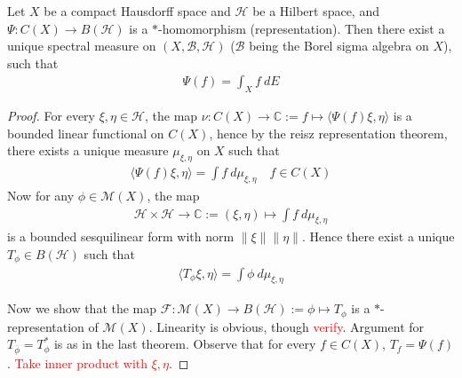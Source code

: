 

\begin{theorem}
  Let $X$ be a compact Hausdorff space and $\mathcal{H}$ be a
  Hilbert space, and $\Psi: C(X) \to B(\mathcal{H})$ is a
  $*$-homomorphism (representation). Then there exist a unique
  spectral measure on $(X, \mathcal{B}, \mathcal{H})$ ($\mathcal{B}$
  being the Borel sigma algebra on $X$), such that
  \begin{align*}
    \Psi(f) = \int_X  f \ d E
  \end{align*}
\end{theorem}
\begin{proof}
  For every $\xi, \eta \in \mathcal{H}$, the map $ \nu : C(X) \to
  \mathbb{C}  :=  f \mapsto \langle  \Psi(f) \xi ,  \eta \rangle $ is
  a bounded linear functional on $C(X)$, hence by the reisz
  representation theorem, there exists a unique measure $\mu_{\xi,
  \eta}$ on $X$ such that
  \begin{align*}
    \langle \Psi(f) \xi ,  \eta \rangle  = \int f \ d \mu_{\xi,
    \eta} \quad f \in C(X)
  \end{align*}
  Now for any $\phi \in \mathcal{M}(X)$, the map
  \begin{align*}
    \mathcal{H}\times \mathcal{H} \to  \mathbb{C} :=  (\xi, \eta)
    \mapsto \int f \ d \mu_{\xi, \eta}
  \end{align*}
  is a bounded sesquilinear form with norm $\|\xi\|\|\eta\|$. Hence
  there exist a unique $T_\phi \in B(\mathcal{H})$ such that
  \begin{align*}
    \langle T_\phi \xi ,  \eta \rangle = \int \phi \ d \mu_{\xi, \eta}
  \end{align*}

  Now we show that the map $\mathscr{F}: \mathcal{M}(X)\to B(\mathcal{H})  :=
  \phi \mapsto    T_\phi$ is a $*$-representation of
  $\mathcal{M}(X)$. Linearity is obvious, though
  \textcolor{red}{verify}. Argument for $T_{\overline{ \phi}} =
  T_{\phi}^*$ is as in the last theorem.
  Observe that for every $f \in C(X)$, $T_f = \Psi(f)$.
  \textcolor{red}{Take inner product with $\xi, \eta$}.
  \marginnote{ \scriptsize \it \textcolor{red}{verify the rest}}


\end{proof}
